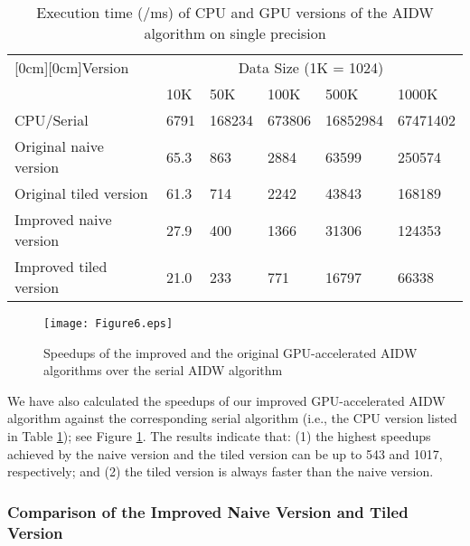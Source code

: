\documentclass[final,5p,times,twocolumn,authoryear]{elsarticle}
\begin{document}
			\begin{table}[htbp]
				\caption{Execution time (/ms) of CPU and GPU versions of the AIDW 
					algorithm on single precision}
				\begin{center}
					\small
					\begin{tabular}{p{50pt}p{20pt}p{20pt}p{30pt}p{30pt}p{30pt}}
        \toprule
						\raisebox{-1.50ex}[0cm][0cm]{Version}& 
						\multicolumn{5}{c}{Data Size (1K = 1024)}  \\
						\cline{2-6} 
						& 
						10K& 
						50K& 
						100K& 
						500K& 
						1000K \\
			\midrule
						CPU/Serial& 
						6791& 
						168234& 
						673806& 
						16852984& 
						67471402 \\
						Original naive version& 
						65.3& 
						863& 
						2884& 
						63599& 
						250574 \\
						Original tiled version& 
						61.3& 
						714& 
						2242& 
						43843& 
						168189 \\
						Improved naive version& 
						27.9& 
						400& 
						1366& 
						31306& 
						124353 \\
						Improved tiled version& 
						21.0& 
						233& 
						771& 
						16797& 
						66338 \\
			\bottomrule
					\end{tabular}
					\label{tab1}
				\end{center}
			\end{table}
			
			\begin{figure}[!h]
				\centering
				\texttt{[image: Figure6.eps]}
				\caption{Speedups of the improved and the original GPU-accelerated 
								AIDW algorithms over the serial AIDW algorithm}
				\label{fig6}
			\end{figure}
			
			We have also calculated the speedups of our improved GPU-accelerated AIDW 
			algorithm against the corresponding serial algorithm (i.e., the CPU version 
			listed in Table \ref{tab1}); see Figure \ref{fig6}. The results indicate that: (1) the highest 
			speedups achieved by the naive version and the tiled version can be up to 
			543 and 1017, respectively; and (2) the tiled version is always faster than 
			the naive version.
			
			\subsubsection{Comparison of the Improved Naive Version and Tiled Version}
			
\end{document}

